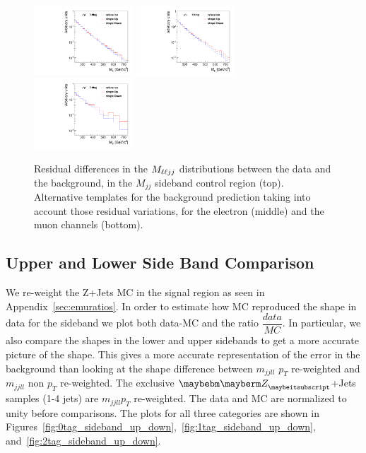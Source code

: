 \begin{figure}[htb]
\begin{center}
{}
\centerline{
\includegraphics[width=0.33\textwidth]{plots/SBres-mm-0b.pdf}
\includegraphics[width=0.33\textwidth]{plots/SBres-mm-1b.pdf}
\includegraphics[width=0.33\textwidth]{plots/SBres-mm-2b.pdf}
}
\caption{Residual differences in the $M_{\ell\ell jj}$ distributions between the data and the background, in the
$M_{jj}$ sideband control region (top). Alternative templates for the background prediction taking into account those residual variations, for the electron (middle) and the muon channels (bottom).    
}
\label{fig:sysshaperes}
\end{center}
\end{figure}



\subsection{Upper and Lower Side Band Comparison}

We re-weight the Z+Jets MC in the signal region as seen in Appendix~\ref{sec:emuratios}. In order to estimate how MC reproduced the shape in data for the sideband we plot both data-MC and the ratio $\dfrac{data}{MC}$.  In particular, we also compare the shapes in the lower and upper sidebands to get a more accurate picture of the shape. This gives a more accurate representation of the error in the background than looking at the shape difference between $m_{jjll}$ $p_{T}$ re-weighted and $m_{jjll}$ non $p_{T}$ re-weighted. The exclusive $\PZ$+Jets samples (1-4 jets) are $m_{jjll} p_{T}$ re-weighted.  The data and MC are normalized to unity before comparisons. The plots for all three categories are shown in Figures~\ref{fig:0tag_sideband_up_down},~\ref{fig:1tag_sideband_up_down}, and~\ref{fig:2tag_sideband_up_down}.  

